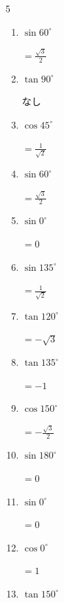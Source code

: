 \begin{multicols}{5}
\begin{enumerate}
        $\displaystyle =0$

  \item $\displaystyle \sin{60^\circ}$

        $\displaystyle =\frac{\sqrt{3}}{2}$

  \item $\displaystyle \tan{90^\circ}$

        $\displaystyle なし$

  \item $\displaystyle \cos{45^\circ}$

        $\displaystyle =\frac{1}{\sqrt{2}}$

  \item $\displaystyle \sin{60^\circ}$

        $\displaystyle =\frac{\sqrt{3}}{2}$

  \item $\displaystyle \sin{0^\circ}$

        $\displaystyle =0$

\columnbreak %

  \item $\displaystyle \sin{135^\circ}$

        $\displaystyle =\frac{1}{\sqrt{2}}$

  \item $\displaystyle \tan{120^\circ}$

        $\displaystyle =-\sqrt{3}$

  \item $\displaystyle \tan{135^\circ}$

        $\displaystyle =-1$

  \item $\displaystyle \cos{150^\circ}$

        $\displaystyle =-\frac{\sqrt{3}}{2}$

  \item $\displaystyle \sin{180^\circ}$

        $\displaystyle =0$

  \item $\displaystyle \sin{0^\circ}$

        $\displaystyle =0$

  \item $\displaystyle \cos{0^\circ}$

        $\displaystyle =1$

  \item $\displaystyle \tan{150^\circ}$


\end{enumerate}
\end{multicols}
